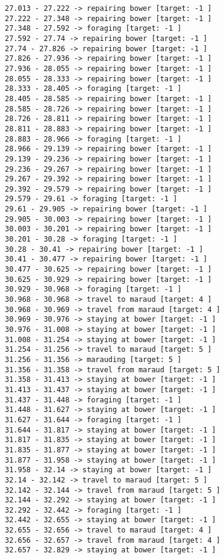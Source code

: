 \documentclass[11pt]{article}
\begin{document}
\begin{Verbatim}[commandchars=\\\{\}]
27.013 - 27.222 -> repairing bower [target: -1 ]
27.222 - 27.348 -> repairing bower [target: -1 ]
27.348 - 27.592 -> foraging [target: -1 ]
27.592 - 27.74 -> repairing bower [target: -1 ]
27.74 - 27.826 -> repairing bower [target: -1 ]
27.826 - 27.936 -> repairing bower [target: -1 ]
27.936 - 28.055 -> repairing bower [target: -1 ]
28.055 - 28.333 -> repairing bower [target: -1 ]
28.333 - 28.405 -> foraging [target: -1 ]
28.405 - 28.585 -> repairing bower [target: -1 ]
28.585 - 28.726 -> repairing bower [target: -1 ]
28.726 - 28.811 -> repairing bower [target: -1 ]
28.811 - 28.883 -> repairing bower [target: -1 ]
28.883 - 28.966 -> foraging [target: -1 ]
28.966 - 29.139 -> repairing bower [target: -1 ]
29.139 - 29.236 -> repairing bower [target: -1 ]
29.236 - 29.267 -> repairing bower [target: -1 ]
29.267 - 29.392 -> repairing bower [target: -1 ]
29.392 - 29.579 -> repairing bower [target: -1 ]
29.579 - 29.61 -> foraging [target: -1 ]
29.61 - 29.905 -> repairing bower [target: -1 ]
29.905 - 30.003 -> repairing bower [target: -1 ]
30.003 - 30.201 -> repairing bower [target: -1 ]
30.201 - 30.28 -> foraging [target: -1 ]
30.28 - 30.41 -> repairing bower [target: -1 ]
30.41 - 30.477 -> repairing bower [target: -1 ]
30.477 - 30.625 -> repairing bower [target: -1 ]
30.625 - 30.929 -> repairing bower [target: -1 ]
30.929 - 30.968 -> foraging [target: -1 ]
30.968 - 30.968 -> travel to maraud [target: 4 ]
30.968 - 30.969 -> travel from maraud [target: 4 ]
30.969 - 30.976 -> staying at bower [target: -1 ]
30.976 - 31.008 -> staying at bower [target: -1 ]
31.008 - 31.254 -> staying at bower [target: -1 ]
31.254 - 31.256 -> travel to maraud [target: 5 ]
31.256 - 31.356 -> marauding [target: 5 ]
31.356 - 31.358 -> travel from maraud [target: 5 ]
31.358 - 31.413 -> staying at bower [target: -1 ]
31.413 - 31.437 -> staying at bower [target: -1 ]
31.437 - 31.448 -> foraging [target: -1 ]
31.448 - 31.627 -> staying at bower [target: -1 ]
31.627 - 31.644 -> foraging [target: -1 ]
31.644 - 31.817 -> staying at bower [target: -1 ]
31.817 - 31.835 -> staying at bower [target: -1 ]
31.835 - 31.877 -> staying at bower [target: -1 ]
31.877 - 31.958 -> staying at bower [target: -1 ]
31.958 - 32.14 -> staying at bower [target: -1 ]
32.14 - 32.142 -> travel to maraud [target: 5 ]
32.142 - 32.144 -> travel from maraud [target: 5 ]
32.144 - 32.292 -> staying at bower [target: -1 ]
32.292 - 32.442 -> foraging [target: -1 ]
32.442 - 32.655 -> staying at bower [target: -1 ]
32.655 - 32.656 -> travel to maraud [target: 4 ]
32.656 - 32.657 -> travel from maraud [target: 4 ]
32.657 - 32.829 -> staying at bower [target: -1 ]

\end{Verbatim}
\end{document}
